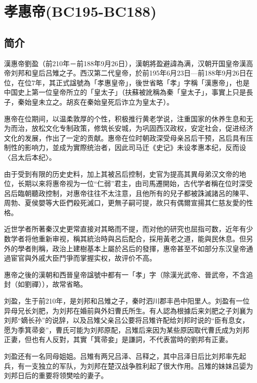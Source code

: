 
\section{孝惠帝\tiny(BC195-BC188)}

\subsection{简介}

漢惠帝劉盈（前210年－前188年9月26日），漢朝將盈避諱為满，汉朝开国皇帝漢高帝刘邦和皇后吕雉之子。西汉第二代皇帝，於前195年6月23日—前188年9月26日在位，在位7年，其正式諡號為「孝惠皇帝」，後世省略「孝」字稱「漢惠帝」，也是中国史上第一位皇帝所立的「皇太子」（扶蘇被訛稱為秦「皇太子」，事實上只是長子，秦始皇未立之。胡亥在秦始皇死后诈立为皇太子）。

惠帝在位期间，以温柔敦厚的个性，积极推行黄老学说，注重国家的休养生息和无为而治，放松文化专制政策，修筑长安城，为巩固西汉政权，安定社会，促进经济文化的发展，作出了一定的贡献。惠帝在位时朝政深受母亲呂后干预，呂后具有压制性的影响力，並成为實際统治者，因此司马迁《史记》未设孝惠本纪，反而设〈吕太后本纪〉。

由于受到有限的历史史料，加上其被呂后控制，史官为提高其異母弟汉文帝的地位，长期以来将惠帝视为一位“仁弱”君主，由司馬遷開始，古代学者稱在位时深受呂后臨朝聽政控制，对惠帝往往不太注意，且他所有的兒子都被誅滅諸呂的陳平、周勃、夏侯嬰等大臣們殺死滅口，更無子嗣可提，故只有偶爾宣揚其仁慈友愛的性格。

近世学者所著秦汉史更常直接对其略而不提，而对他的研究也屈指可数，近年有少数学者将他重新审视，稱其統治時與呂后配合，採用黃老之道，能與民休息。但另外的學者則稱，政治上建樹基本上屬於呂后的發揮，惠帝甚至不如部分东汉皇帝通過宦官與外戚大臣鬥爭而掌握实权，故评价不高。

惠帝之後的漢朝和西晉皇帝諡號中都有一「孝」字（除漢光武帝、晉武帝，不含追封（如劉禪）），故常省略。

刘盈，生于前210年，是刘邦和吕雉之子，秦时泗川郡丰邑中阳里人。刘盈有一位异母兄长刘肥，为刘邦在婚前與外妇曹氏所生。有人認為根據后来刘肥之子刘襄为刘邦“嫡长孙”的说辞，以及吕雉父亲吕公要将吕雉许配给刘邦时说的“臣有息女，愿为季箕帚妾”，曹氏可能为刘邦原配，吕雉后来因为某些原因取代曹氏成为刘邦正妻，但也有人反對，其實「箕帚妾」是謙詞，不代表當時的劉邦有正妻。

刘盈还有一名同母姐姐。吕雉有两兄吕泽、吕释之，其中吕泽日后比刘邦率先起兵，有一支独立的军队，为刘邦在楚汉战争胜利起了很大作用。吕雉的妹妹吕媭为刘邦日后的重要将领樊哙的妻子。


